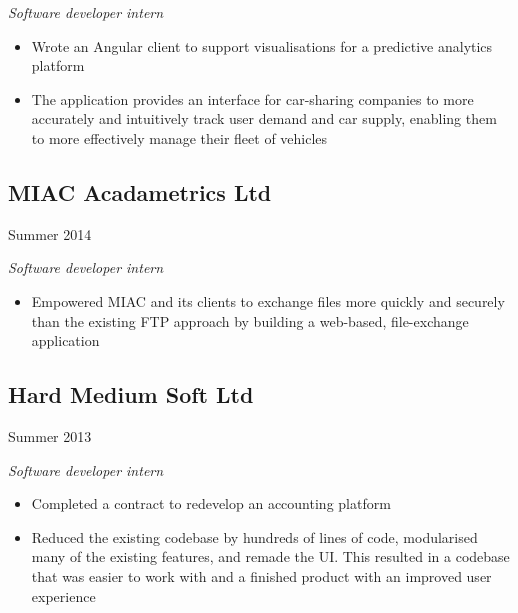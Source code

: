 \emph{Software developer intern}

\begin{itemize}
\item Wrote an Angular client to support visualisations for a predictive
  analytics platform
\item The application provides an interface for car-sharing companies to more
  accurately and intuitively track user demand and car supply, enabling them to
  more effectively manage their fleet of vehicles
\end{itemize}

\noindent\begin{minipage}[t]{0.5\textwidth}
  \subsection*{MIAC Acadametrics Ltd}
\end{minipage}
\noindent\begin{minipage}[t]{0.5\textwidth}
  \flushright
  Summer 2014
\end{minipage}

\emph{Software developer intern}

\begin{itemize}
\item Empowered MIAC and its clients to exchange files more quickly and securely
  than the existing FTP approach by building a web-based, file-exchange
  application
\end{itemize}

\noindent\begin{minipage}[t]{0.5\textwidth}
  \subsection*{Hard Medium Soft Ltd}
\end{minipage}
\noindent\begin{minipage}[t]{0.5\textwidth}
  \flushright
  Summer 2013
\end{minipage}

\emph{Software developer intern}

\begin{itemize}
\item Completed a contract to redevelop an accounting platform
\item Reduced the existing codebase by hundreds of lines of code, modularised
  many of the existing features, and remade the UI. This resulted in a codebase
  that was easier to work with and a finished product with an improved user
  experience
\end{itemize}

